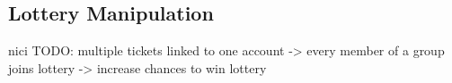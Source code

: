 \subsection{Lottery Manipulation}\label{subsection:lottery-manipulation}

nici
TODO: multiple tickets linked to one account -> every member of a group joins lottery -> increase chances to win lottery
